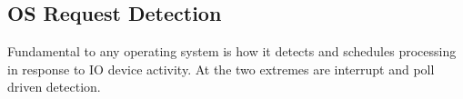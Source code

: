 


\subsection{OS Request Detection}
Fundamental to any operating system is how it detects and schedules processing in response to IO device activity.  At the two extremes are interrupt and poll driven detection.  

